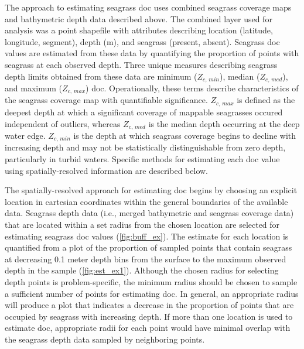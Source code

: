 \documentclass[letterpaper,12pt,oneside]{article}\usepackage[]{graphicx}\usepackage[]{color}
\begin{document}
The approach to estimating seagrass \acl{doc} uses combined seagrass coverage maps and bathymetric depth data described above.  The combined layer used for analysis was a point shapefile with attributes describing location (latitude, longitude, segment), depth (m), and seagrass (present, absent).  Seagrass \ac{doc} values are estimated from these data by quantifying the proportion of points with seagrass at each observed depth.  Three unique measures describing seagrass depth limits obtained from these data are minimum ($Z_{c,\,min}$), median ($Z_{c,\,med}$), and maximum ($Z_{c,\,max}$) \acl{doc}.  Operationally, these terms describe characteristics of the seagrass coverage map with quantifiable significance. $Z_{c,\,max}$ is defined as the deepest depth at which a significant coverage of mappable seagrasses occured independent of outliers, whereas  $Z_{c,\,med}$ is the median depth occurring at the deep water edge. $Z_{c,\,min}$ is the depth at which seagrass coverage begins to decline with increasing depth and may not be statistically distinguishable from zero depth, particularly in turbid waters. Specific methods for estimating each \ac{doc} value using spatially-resolved information are described below. 

The spatially-resolved approach for estimating \ac{doc} begins by choosing an explicit location in cartesian coordinates within the general boundaries of the available data.  Seagrass depth data (i.e., merged bathymetric and seagrass coverage data) that are located within a set radius from the chosen location are selected for estimating seagrass \ac{doc} values (\cref{fig:buff_ex}). The estimate for each location is quantified from a plot of the proportion of sampled points that contain seagrass at decreasing 0.1 meter depth bins from the surface to the maximum observed depth in the sample (\cref{fig:est_ex1}).  Although the chosen radius for selecting depth points is problem-specific, the minimum radius should be chosen to sample a sufficient number of points for estimating \ac{doc}.  In general, an appropriate radius will produce a plot that indicates a decrease in the proportion of points that are occupied by seagrass with increasing depth. If more than one location is used to estimate \ac{doc}, appropriate radii for each point would have minimal overlap with the seagrass depth data sampled by neighboring points.     
\end{document}
